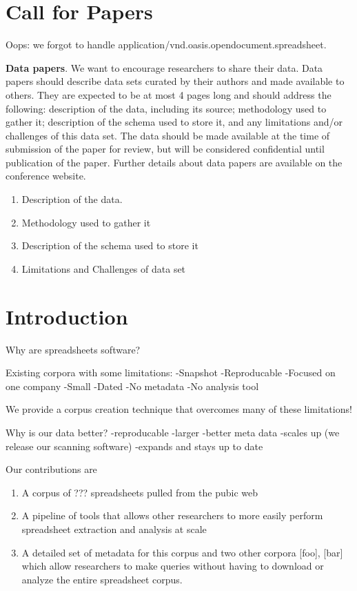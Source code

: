 \documentclass[conference]{IEEEtran}
\begin{document}
\section{Call for Papers}

Oops: we forgot to handle application/vnd.oasis.opendocument.spreadsheet.

\textbf{Data papers}. We want to encourage researchers to share their data. Data papers should describe data sets curated by their authors and made available to others. They are expected to be at most 4 pages long and should address the following: description of the data, including its source; methodology used to gather it; description of the schema used to store it, and any limitations and/or challenges of this data set. The data should be made available at the time of submission of the paper for review, but will be considered confidential until publication of the paper. Further details about data papers are available on the conference website. 

\begin{enumerate}
\item Description of the data.
\item Methodology used to gather it
\item Description of the schema used to store it
\item Limitations and Challenges of data set
\end{enumerate}

\section{Introduction}

Why are spreadsheets software?

Existing corpora with some limitations:
-Snapshot
-Reproducable
-Focused on one company
-Small
-Dated
-No metadata
-No analysis tool

We provide a corpus creation technique that overcomes many of these limitations!

Why is our data better?
-reproducable
-larger
-better meta data
-scales up (we release our scanning software)
-expands and stays up to date


Our contributions are 
\begin{enumerate}
\item A corpus of ??? spreadsheets pulled from the pubic web
\item A pipeline of tools that allows other researchers to more easily perform spreadsheet extraction and analysis at scale
\item A detailed set of metadata for this corpus and two other corpora [foo], [bar]  which allow researchers to make queries without having to download or analyze the entire spreadsheet corpus.  
\end{enumerate}
\end{document}
